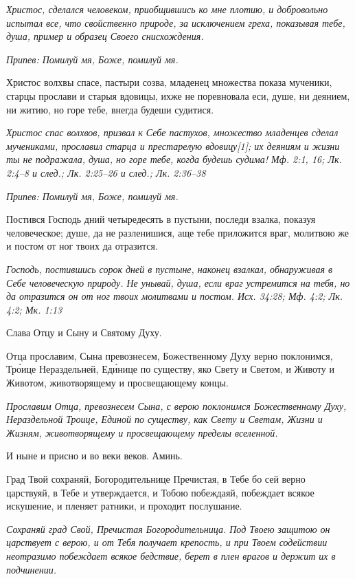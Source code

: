 \itshape Христос, сделался человеком, приобщившись ко мне плотию, и добровольно испытал все, что свойственно природе, за исключением греха, показывая тебе, душа, пример и образец Своего снисхождения.\normalfont{}


\itshape Припев:\normalfont{} Помилуй мя, Боже, помилуй мя.


Христос волхвы спасе, пастыри созва, младенец множества показа мученики, старцы прослави и старыя вдовицы, ихже не поревновала еси, душе, ни деянием, ни житию, но горе тебе, внегда будеши судитися.


\itshape Христос спас волхвов, призвал к Себе пастухов, множество младенцев сделал мучениками, прославил старца и престарелую вдовицу[1]; их деяниям и жизни ты не подражала, душа, но горе тебе, когда будешь судима! Мф. 2:1, 16; Лк. 2:4–8 и след.; Лк. 2:25–26 и след.; Лк. 2:36–38\normalfont{}


\itshape Припев:\normalfont{} Помилуй мя, Боже, помилуй мя.


Постився Господь дний четыредесять в пустыни, последи взалка, показуя человеческое; душе, да не разленишися, аще тебе приложится враг, молитвою же и постом от ног твоих да отразится.


\itshape Господь, постившись сорок дней в пустыне, наконец взалкал, обнаруживая в Себе человеческую природу. Не унывай, душа, если враг устремится на тебя, но да отразится он от ног твоих молитвами и постом. Исх. 34:28; Мф. 4:2; Лк. 4:2; Мк. 1:13\normalfont{}


Слава Отцу и Сыну и Святому Духу.


Отца прославим, Сына превознесем, Божественному Духу верно поклонимся, Тро́ице Нераздельней, Еди́нице по существу, яко Свету и Светом, и Животу и Животом, животворящему и просвещающему концы.


\itshape Прославим Отца, превознесем Сына, с верою поклонимся Божественному Духу, Нераздельной Троице, Единой по существу, как Свету и Светам, Жизни и Жизням, животворящему и просвещающему пределы вселенной.\normalfont{}


И ныне и присно и во веки веков. Аминь.


Град Твой сохраняй, Богородительнице Пречистая, в Тебе бо сей верно царствуяй, в Тебе и утверждается, и Тобою побеждаяй, побеждает всякое искушение, и пленяет ратники, и проходит послушание.


\itshape Сохраняй град Свой, Пречистая Богородительница. Под Твоею защитою он царствует с верою, и от Тебя получает крепость, и при Твоем содействии неотразимо побеждает всякое бедствие, берет в плен врагов и держит их в подчинении.\normalfont{}



